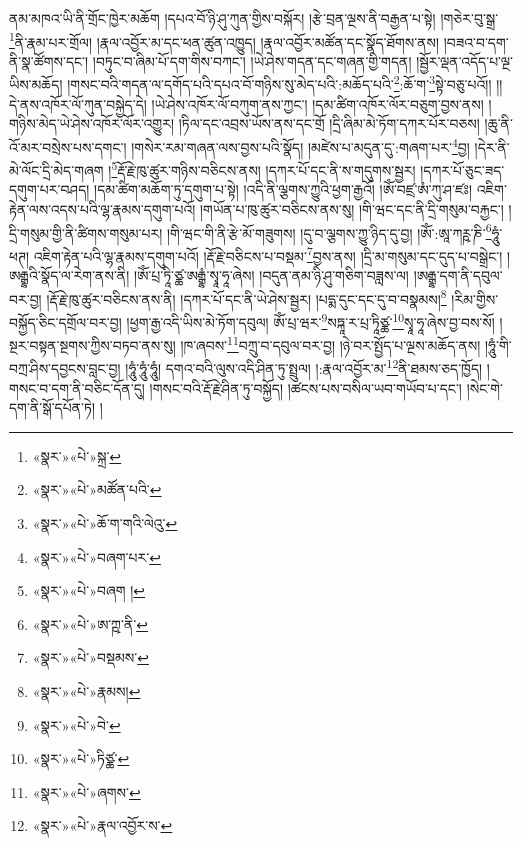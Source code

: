 ནམ་མཁའ་ཡི་ནི་གྲོང་ཁྱེར་མཆོག །དཔའ་བོ་ཉི་ཤུ་ཀུན་གྱིས་བསྐོར། །རྩེ་བྲན་ལྔས་ནི་བརྒྱན་པ་སྟེ། །གཅེར་བུ་སྒྲ་\footnote{«སྣར་»«པེ་»སྐྲ་}ནི་རྣམ་པར་གྲོལ། །རྣལ་འབྱོར་མ་དང་ཕན་ཚུན་འཁྱུད། །རྣལ་འབྱོར་མཚོན་དང་སྣོད་ཐོགས་ནས། །བཟའ་བ་དག་ནི་སྣ་ཚོགས་དང་། །བཏུང་བ་ཞིམ་པོ་དག་གིས་བཀང་། །ཡེ་ཤེས་གདན་དང་གཞན་གྱི་གདན། །སྦྱོར་ལྡན་འདོད་པ་ལྔ་ཡིས་མཆོད། །གསང་བའི་གདན་ལ་དགོད་པའི་དཔའ་བོ་གཉིས་སུ་མེད་པའི་:མཆོད་པའི་\footnote{«སྣར་»«པེ་»མཚོན་པའི་}:ཆོ་ག་\footnote{«སྣར་»«པེ་»ཆོ་ག་གའི་ལེའུ་}སྟེ་བཅུ་པའོ།། །།དེ་ནས་འཁོར་ལོ་ཀུན་བསྐྱེད་དེ། །ཡེ་ཤེས་འཁོར་ལོ་བཀུག་ནས་ཀྱང་། །དམ་ཚིག་འཁོར་ལོར་བཅུག་བྱས་ནས། །གཉིས་མེད་ཡེ་ཤེས་འཁོར་ལོར་འགྱུར། །ཏིལ་དང་འབྲས་ཡོས་ནས་དང་གྲོ །དྲི་ཞིམ་མེ་ཏོག་དཀར་པོར་བཅས། །ཆུ་ནི་འོ་མར་བསྲེས་པས་དགང་། །གསེར་རམ་གཞན་ལས་བྱས་པའི་སྣོད། །མཛེས་པ་མདུན་དུ་:གཞག་པར་\footnote{«སྣར་»«པེ་»བཞག་པར་}བྱ། །དེར་ནི་མེ་ལོང་དྲི་མེད་གཞག །\footnote{«སྣར་»«པེ་»བཞག །}རྡོ་རྗེ་ཁུ་ཚུར་གཉིས་བཅིངས་ནས། །དཀར་པོ་དང་ནི་ས་གདུགས་སྦྱར། །དཀར་པོ་ཅུང་ཟད་དགུག་པར་བཤད། །དམ་ཚིག་མཆོག་ཏུ་དགུག་པ་སྟེ། །འདི་ནི་ལྕགས་ཀྱུའི་ཕྱག་རྒྱའོ། །ཨོཾ་བཛྲ་ཨཾ་ཀུ་ཤ་ཛཿ། འཇིག་རྟེན་ལས་འདས་པའི་ལྷ་རྣམས་དགུག་པའོ། །གཡོན་པ་ཁུ་ཚུར་བཅིངས་ནས་སུ། །གི་ཝང་དང་ནི་དྲི་གསུམ་བརྐྱང་། །དྲི་གསུམ་གྱི་ནི་ཚིགས་གསུམ་པར། །གི་ཝང་གི་ནི་རྩེ་མོ་གཟུགས། །དུ་བ་ལྕགས་ཀྱུ་ཉིད་དུ་བྱ། །ཨོཾ་:ཨཱ་ཀཪྵ་ཎི་\footnote{«སྣར་»«པེ་»ཨ་ཀྵ་ནི་}ཧཱུཾ་ཕཊ། འཇིག་རྟེན་པའི་ལྷ་རྣམས་དགུག་པའོ། །རྡོ་རྗེ་བཅིངས་པ་བསྡམ་\footnote{«སྣར་»«པེ་»བསྡམས་}བྱས་ནས། །དྲི་མ་གསུམ་དང་དུད་པ་བསྒྲེང་། །ཨརྒྷའི་སྣོད་ལ་རེག་ནས་ནི། །ཨོཾ་པྲ་ཏཱི་ཙྪ་ཨརྒྷཾ་སྭཱ་ཧཱ་ཞེས། །བདུན་ནམ་ཉི་ཤུ་གཅིག་བཟླས་ལ། །ཨརྒྷ་དག་ནི་དབུལ་བར་བྱ། །རྡོ་རྗེ་ཁུ་ཚུར་བཅིངས་ནས་ནི། །དཀར་པོ་དང་ནི་ཡེ་ཤེས་སྦྱར། །པདྨ་དུང་དང་དུ་བ་བསྣམས།\footnote{«སྣར་»«པེ་»རྣམས།} །རིམ་གྱིས་བསྐྱོད་ཅིང་དགྲོལ་བར་བྱ། །ཕྱག་རྒྱ་འདི་ཡིས་མེ་ཏོག་དབུལ། ཨོཾ་པྲ་ཝར་\footnote{«སྣར་»«པེ་»བེ་}སཏྐཱ་ར་པྲ་ཏཱིཙྪ་\footnote{«སྣར་»«པེ་»ཏིཙྪ་}སྭཱ་ཧཱ་ཞེས་བྱ་བས་སོ། །སྔར་བསྟན་སྔགས་ཀྱིས་བཏབ་ནས་སུ། །ཁ་ཞབས་\footnote{«སྣར་»«པེ་»ཞགས་}བཀྲུ་བ་དབུལ་བར་བྱ། །ཉེ་བར་སྤྱོད་པ་ལྔས་མཆོད་ནས། །ཧཱུཾ་གི་བཀྲ་ཤིས་དབྱངས་བླང་བྱ། །ཧཱུཾ་ཧཱུཾ་ཧཱུཾ། དགའ་བའི་ལུས་འདི་ཤིན་ཏུ་སྤྲུལ། །:རྣལ་འབྱོར་མ་\footnote{«སྣར་»«པེ་»རྣལ་འབྱོར་ས་}ནི་ཐམས་ཅད་ཁྱོད། །གསང་བ་དག་ནི་བཅིང་དོན་དུ། །གསང་བའི་རྡོ་རྗེ་ཤིན་ཏུ་བསྐྱོད། །ཚངས་པས་བསིལ་ཡབ་གཡོབ་པ་དང་། །སེང་གེ་དག་ནི་སྒོ་དཔོན་ཏེ། །
